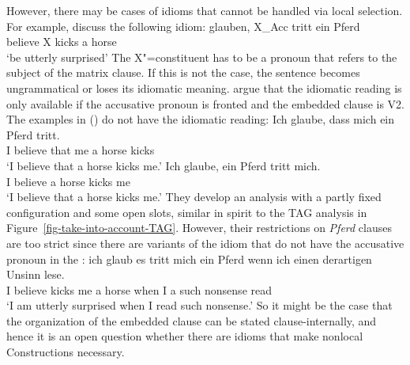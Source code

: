 \documentclass[output=paper,biblatex,babelshorthands,newtxmath,draftmode,colorlinks,citecolor=brown]{langscibook}
\begin{document}
However, there may be cases of idioms that cannot be handled via local selection.
For example,  discuss the following idiom:
\ea
\label{mich-tritt-ein-Pferd}
\gll glauben, X\_Acc tritt ein Pferd\\
     believe  X     kicks a horse\\
\glt `be utterly surprised'
\z
\largerpage
The X"=constituent has to be a pronoun that refers to the subject of the matrix clause. If this is not the case, the sentence becomes ungrammatical or loses its idiomatic meaning.
\eal
{}
\zl
\citet[]{RS2009a} argue that the idiomatic reading
is only available if the accusative pronoun is fronted and the embedded clause is V2. The examples
in () do not have the idiomatic reading:
\eal
\ex
\gll Ich glaube, dass mich ein Pferd tritt.\\
     I believe   that me   a horse   kicks\\
\glt `I believe that a horse kicks me.'
\ex
\gll Ich glaube, ein Pferd tritt mich.\\
     I believe   a horse   kicks me\\
\glt `I believe that a horse kicks me.'
\zl
They develop an analysis with a partly fixed configuration and some open slots, similar in spirit to
the TAG analysis in Figure~\ref{fig-take-into-account-TAG}. However, their restrictions on \emph{Pferd} clauses are too strict since there are
variants of the idiom that do not have the accusative pronoun in the \vf:
\ea
\gll ich glaub es tritt mich ein Pferd wenn ich einen derartigen Unsinn lese.\footnotemark\\
     I believe \expl{} kicks me a horse when I a such nonsense read\\
\glt `I am utterly surprised when I read such nonsense.'
\z
So it might be the case that the organization of the embedded clause can be stated clause-internally,
and hence it is an open question whether there are idioms that make nonlocal Constructions necessary.
\end{document}
